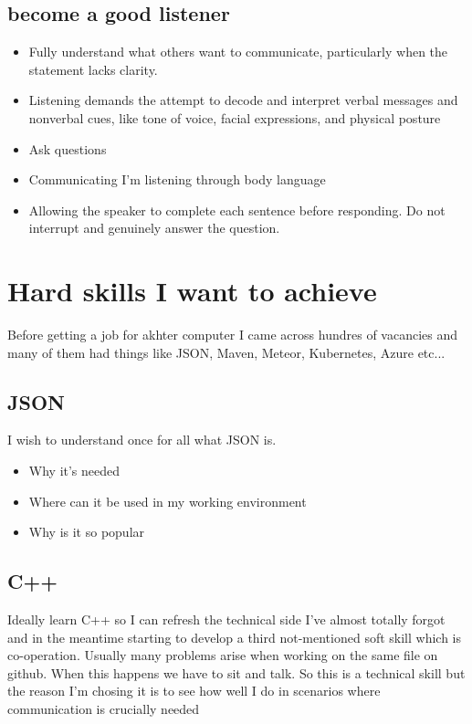 \documentclass[a4paper,12pt]{article}
\begin{document}
\subsection{become a good listener}
\begin{itemize}
\item Fully understand what others want to communicate, particularly when the statement lacks clarity.
\item Listening demands the attempt to decode and interpret verbal messages and nonverbal cues, like tone of voice, facial expressions, and physical posture
\item Ask questions
\item Communicating I'm listening through body language
\item Allowing the speaker to complete each sentence before responding. Do not interrupt and genuinely answer the question.
\end{itemize}

\section{Hard skills I want to achieve}
Before getting a job for akhter computer I came across hundres of vacancies and many of them had things like JSON, Maven, Meteor, Kubernetes, Azure etc...

\subsection{JSON}
I wish to understand once for all what JSON is.
\begin {itemize}
\item Why it's needed
\item Where can it be used in my working environment
\item Why is it so popular
\end {itemize}

\subsection{C++}
Ideally learn C++ so I can refresh the technical side I've almost totally forgot and in the meantime starting to develop a third not-mentioned soft skill which is co-operation. Usually many problems arise when working on the same file on github. When this happens we have to sit and talk. So this is a technical skill but the reason I'm chosing it is to see how well I do in scenarios where communication is crucially needed
\clearpage

\printindex
\end{document}
